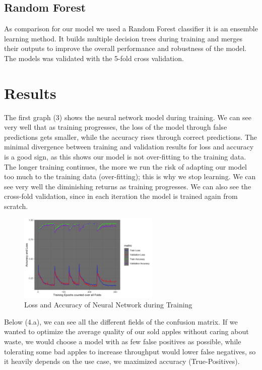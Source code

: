 \documentclass[
]{report}
\begin{document}
\subsection{Random Forest}\label{random-forest}

As comparison for our model we used a Random Forest classifier it is an
ensemble learning method. It builds multiple decision trees during
training and merges their outputs to improve the overall performance and
robustness of the model. The models was validated with the 5-fold cross
validation.

\section{Results}\label{results}

The first graph (3) shows the neural network model during training. We
can see very well that as training progresses, the loss of the model
through false predictions gets smaller, while the accuracy rises through
correct predictions. The minimal divergence between training and
validation results for loss and accuracy is a good sign, as this shows
our model is not over-fitting to the training data. The longer training
continues, the more we run the risk of adapting our model too much to
the training data (over-fitting); this is why we stop learning. We can
see very well the diminishing returns as training progresses. We can
also see the cross-fold validation, since in each iteration the model is
trained again from scratch.

\begin{figure}[h]
  \centering
  \includegraphics[width=0.6\textwidth]{images/NN1.png}
  \caption{Loss and Accuracy of Neural Network during Training}
  \label{fig:pca_combined}
\end{figure}

Below (4.a), we can see all the different fields of the confusion
matrix. If we wanted to optimize the average quality of our sold apples
without caring about waste, we would choose a model with as few false
positives as possible, while tolerating some bad apples to increase
throughput would lower false negatives, so it heavily depends on the use
case, we maximized accuracy (True-Positives).
\end{document}
